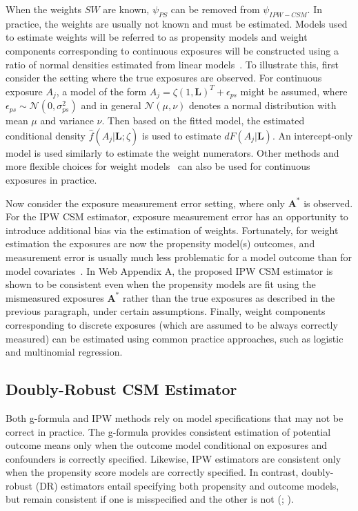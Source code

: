 \documentclass[useAMS,usenatbib,referee]{biom}
\begin{document}
When the weights $SW$ are known, $\psi_{PS}$ can be removed from $\psi_{IPW-CSM}$. In practice, the weights are usually not known and must be estimated. Models used to estimate weights will be referred to as propensity models and weight components corresponding to continuous exposures will be constructed using a ratio of normal densities estimated from linear models~\citep{hirano2004}. To illustrate this, first consider the setting where the true exposures are observed. For continuous exposure $A_{j}$, a model of the form $A_{j} = \zeta (1, \bm{L})^{T} + \epsilon_{ps}$ might be assumed, where $\epsilon_{ps} \sim \mathcal{N}(0, \sigma^{2}_{ps})$ and in general $\mathcal{N}(\mu, \nu)$ denotes a normal distribution with mean $\mu$ and variance $\nu$. Then based on the fitted model, the estimated conditional density $\hat{f}(A_{j} | \bm{L}; \hat{\zeta})$ is used to estimate $dF(A_{j} | \bm{L})$. An intercept-only model is used similarly to estimate the weight numerators. Other methods and more flexible choices for weight models~\citep{naimi2014} can also be used for continuous exposures in practice.

Now consider the exposure measurement error setting, where only $\bm{A}^{*}$ is observed. For the IPW CSM estimator, exposure measurement error has an opportunity to introduce additional bias via the estimation of weights. Fortunately, for weight estimation the exposures are now the propensity model(s) outcomes, and measurement error is usually much less problematic for a model outcome than for model covariates~\citep{carroll2006}. In Web Appendix A, the proposed IPW CSM estimator is shown to be consistent even when the propensity models are fit using the mismeasured exposures $\bm{A}^{*}$ rather than the true exposures as described in the previous paragraph, under certain assumptions. Finally, weight components corresponding to discrete exposures (which are assumed to be always correctly measured) can be estimated using common practice approaches, such as logistic and multinomial regression.

\subsection{Doubly-Robust CSM Estimator}

Both g-formula and IPW methods rely on model specifications that may not be correct in practice. The g-formula provides consistent estimation of potential outcome means only when the outcome model conditional on exposures and confounders is correctly specified. Likewise, IPW estimators are consistent only when the propensity score models are correctly specified. In contrast, doubly-robust (DR) estimators entail specifying both propensity and outcome models, but remain consistent if one is misspecified and the other is not (\citealp*{robins1994}; \citealp{lunceford2004,bang2005}).
\end{document}

